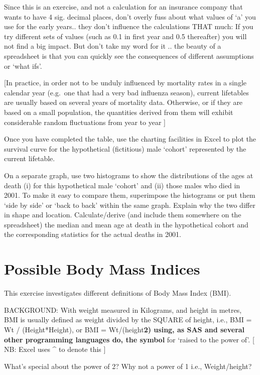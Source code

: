 \documentclass[]{book}
\begin{document}
Since this is an exercise, and not a calculation for an insurance company that wants to have 4 sig. decimal places, don't overly fuss about what values of `a' you use for the early years.. they don't influence the calculations THAT much: If you try different sets of values (such as 0.1 in first year and 0.5 thereafter) you will not find a big impact. But don't take my word for it .. the beauty of a spreadsheet is that you can quickly see the consequences of different assumptions or `what ifs'.

{[}In practice, in order not to be unduly influenced by mortality rates in a single calendar year (e.g.~one that had a very bad influenza season), current lifetables are usually based on several years of mortality data. Otherwise, or if they are based on a small population, the quantities derived from them will exhibit considerable random fluctuations from year to year {]}

Once you have completed the table, use the charting facilities in Excel to plot the survival curve for the hypothetical (fictitious) male `cohort' represented by the current lifetable.

On a separate graph, use two histograms to show the distributions of the ages at death (i) for this hypothetical male `cohort' and (ii) those males who died in 2001. To make it easy to compare them, superimpose the histograms or put them `side by side' or `back to back' within the same graph. Explain why the two differ in shape and location. Calculate/derive (and include them somewhere on the spreadsheet) the median and mean age at death in the hypothetical cohort and the corresponding statistics for the actual deaths in 2001.

\hypertarget{possible-body-mass-indices}{%
\section{Possible Body Mass Indices}\label{possible-body-mass-indices}}

This exercise investigates different definitions of Body Mass Index (BMI).

BACKGROUND: With weight measured in Kilograms, and height in metres, BMI is usually defined as weight divided by the SQUARE of height, i.e., BMI = Wt / (Height*Height), or BMI = Wt/(height\textbf{2) using, as SAS and several other programming languages do, the symbol } for `raised to the power of'. {[} NB: Excel uses \^{} to denote this {]}

What's special about the power of 2? Why not a power of 1 i.e., Weight/height?
\end{document}
